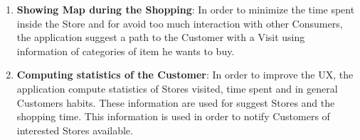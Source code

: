 \documentclass[a4paper, 12pt, oneside]{article}
\newcommand{\yasmin}[1]{\textcolor{Red}{#1}}
\newcommand{\giovanni}[1]{\textcolor{Blue}{#1}}
\begin{document}
\begin{enumerate}
\item \textbf{Showing Map during the Shopping}: In order to minimize the time spent inside the Store and for avoid too much interaction with other Consumers, the application suggest a path to the Customer with a Visit using information of categories of item he wants to buy.

\item \textbf{Computing statistics of the Customer}: In order to improve the UX, the application compute statistics of Stores visited, time spent and in general Customers habits. These information are used for suggest Stores and the shopping time. This information is used in order to notify Customers of interested Stores available. %
\end{enumerate}
\end{document}
